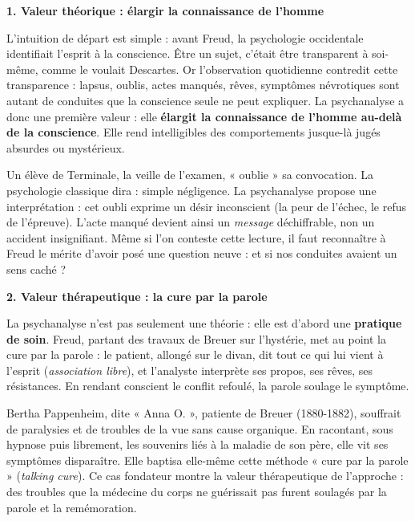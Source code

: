 \documentclass[11pt]{article}
\newcommand{\cle}[1]{{\popxbold\color{popdark}#1}}
\newcounter{popsec}
\newcounter{popsub}
\newcommand{\courssub}[1]{%
  \stepcounter{popsub}%
  \par\vspace{9pt}\noindent{\popxbold\fontsize{11.5}{13}\selectfont\color{popink}{\color{poporange}\thepopsec.\thepopsub}\hspace{6pt}#1}\par\nopagebreak\vspace{4pt}
}
\begin{document}
\courssub{La valeur de la psychanalyse}

\textbf{1. Valeur théorique : élargir la connaissance de l'homme}\par

L'intuition de départ est simple : avant Freud, la psychologie occidentale identifiait l'esprit à la conscience. Être un sujet, c'était être transparent à soi-même, comme le voulait Descartes. Or l'observation quotidienne contredit cette transparence : lapsus, oublis, actes manqués, rêves, symptômes névrotiques sont autant de conduites que la conscience seule ne peut expliquer. La psychanalyse a donc une première valeur : elle \textbf{élargit la connaissance de l'homme au-delà de la conscience}. Elle rend intelligibles des comportements jusque-là jugés absurdes ou mystérieux.

\begin{exemplebox}
Un élève de Terminale, la veille de l'examen, « oublie » sa convocation. La psychologie classique dira : simple négligence. La psychanalyse propose une interprétation : cet oubli exprime un désir inconscient (la peur de l'échec, le refus de l'épreuve). L'acte manqué devient ainsi un \emph{message} déchiffrable, non un accident insignifiant. Même si l'on conteste cette lecture, il faut reconnaître à Freud le mérite d'avoir posé une question neuve : et si nos conduites avaient un sens caché ?
\end{exemplebox}

\textbf{2. Valeur thérapeutique : la cure par la parole}\par

La psychanalyse n'est pas seulement une théorie : elle est d'abord une \textbf{pratique de soin}. Freud, partant des travaux de Breuer sur l'hystérie, met au point la \cle{cure par la parole} : le patient, allongé sur le divan, dit tout ce qui lui vient à l'esprit (\emph{association libre}), et l'analyste interprète ses propos, ses rêves, ses résistances. En rendant conscient le conflit refoulé, la parole soulage le symptôme.

\begin{exemplebox}
Bertha Pappenheim, dite « Anna O. », patiente de Breuer (1880-1882), souffrait de paralysies et de troubles de la vue sans cause organique. En racontant, sous hypnose puis librement, les souvenirs liés à la maladie de son père, elle vit ses symptômes disparaître. Elle baptisa elle-même cette méthode « cure par la parole » (\emph{talking cure}). Ce cas fondateur montre la valeur thérapeutique de l'approche : des troubles que la médecine du corps ne guérissait pas furent soulagés par la parole et la remémoration.
\end{exemplebox}
\end{document}
